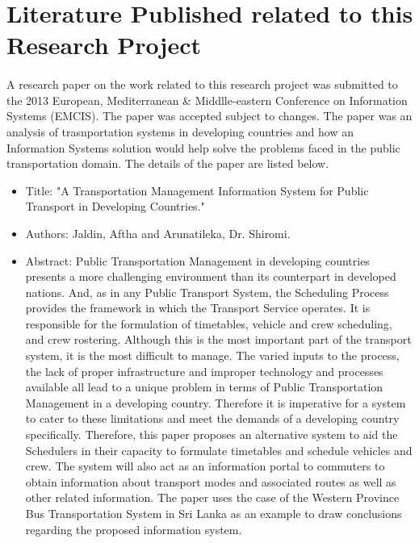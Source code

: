 \documentclass[12pt, oneside]{report}
\begin{document}
\newpage

\section{Literature Published related to this Research Project}

\paragraph{} A research paper on the work related to this research project was submitted to the 2013 European, Mediterranean \& Middlle-eastern Conference on Information Systems (EMCIS). The paper was accepted subject to changes. The paper was an analysis of trasnportation systems in developing countries and how an Information Systems solution would help solve the problems faced in the public transportation domain. The details of the paper are listed below.

\begin {itemize}
\item Title: "A Transportation Management Information System for Public Transport in Developing Countries."
\item Authors: Jaldin, Aftha and Arunatileka, Dr. Shiromi.
\item Abstract: Public Transportation Management in developing countries presents a more challenging environment than its counterpart in developed nations. And, as in any Public Transport System, the Scheduling Process provides the framework in which the Transport Service operates. It is responsible for the formulation of timetables, vehicle and crew scheduling, and crew rostering. Although this is the most important part of the transport system, it is the most difficult to manage. The varied inputs to the process, the lack of proper infrastructure and improper technology and processes available all lead to a unique problem in terms of Public Transportation Management in a developing country. Therefore it is imperative for a system to cater to these limitations and meet the demands of a developing country specifically. Therefore, this paper proposes an alternative system to aid the Schedulers in their capacity to formulate timetables and schedule vehicles and crew. The system will also act as an information portal to commuters to obtain information about transport modes and associated routes as well as other related information. The paper uses the case of the Western Province Bus Transportation System in Sri Lanka as an example to draw conclusions regarding the proposed information system.
\end {itemize}
\end{document}
